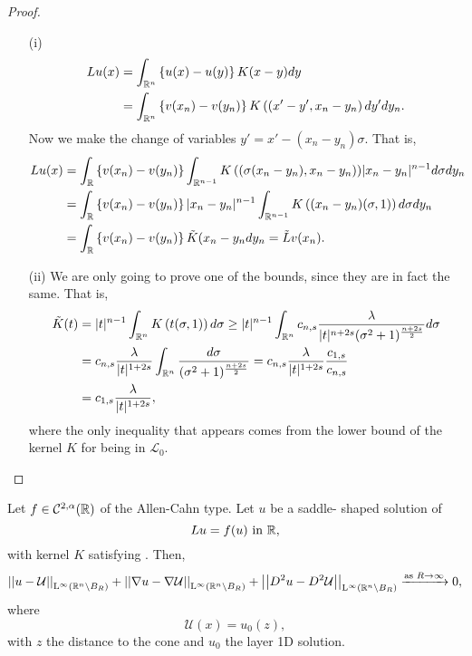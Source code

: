 \begin{proof}
	\begin{enumerate}
		\item[(i)]
		\begin{align*}
		Lu(x) &= \int_{\mathbb{R}^n} \left\{ u(x)-u(y) \right\} K(x-y) dy \\
		&=\int_{\mathbb{R}^n} \left\{ v(x_n)-v(y_n) \right\} K\left((x'-y',x_n-y_n\right) dy'dy_n.
		\end{align*}
		Now we make the change of variables $y' = x'-(x_n-y_n)\sigma$. That is,
		\begin{align*}
		Lu(x) &= \int_{\mathbb{R}} \left\{ v(x_n)-v(y_n) \right\} \int_{\mathbb{R}^{n-1}} K\left((\sigma(x_n-y_n),x_n-y_n\right)) |x_n-y_n|^{n-1} d\sigma dy_n \\
		&= \int_{\mathbb{R}} \left\{ v(x_n)-v(y_n) \right\} |x_n-y_n|^{n-1} \int_{\mathbb{R}^{n-1}} K\left((x_n-y_n)(\sigma,1)\right) d\sigma dy_n \\
		&= \int_{\mathbb{R}} \left\{ v(x_n)-v(y_n) \right\} \tilde{K}(x_n-y_n dy_n = \tilde{L}v(x_n). \\
		\end{align*}
		\item[(ii)] We are only going to prove one of the bounds, since they are in fact the same. That is,
		\begin{align*}
		\tilde{K}(t) &= |t|^{n-1} \int_{\mathbb{R}^n} K\left(t(\sigma,1)\right) d\sigma \geq |t|^{n-1} \int_{\mathbb{R}^n} c_{n,s} \frac{\lambda}{|t|^{n+2s}(\sigma^2+
			1)^{\frac{n+2s}{2}}} d\sigma \\
		&= c_{n,s} \frac{\lambda}{|t|^{1+2s}} \int_{\mathbb{R}^n} \frac{d\sigma}{(\sigma^2+1)^{\frac{n+2s}{2}}} = c_{n,s} \frac{\lambda}{|t|^{1+2s}} \frac{c_{1,s}}{c_{n,s}} \\
		&= c_{1,s} \frac{\lambda}{|t|^{1+2s}},
		\end{align*}
		where the only inequality that appears comes from the lower bound of the kernel $K$ for being in $\mathcal{L}_0$.
	\end{enumerate}
\end{proof}







\begin{theorem}
\label{Thm:AsymptoticBehaviourSaddleSolution}
Let $f\in \mathcal{C}^{2,\alpha}(\mathbb{R})$ of the Allen-Cahn type. Let $u$ be a saddle- shaped solution of
$$
Lu = f(u) \ \textrm{in } \R,
$$
with kernel $K$ satisfying .
Then,
$$
\left | \left |{u-\mathcal{U}} \right | \right |_{\mathrm{L}^{\infty}(\mathbb{R}^n\setminus B_R)}+\left | \left |{\nabla u-\nabla \mathcal{U}} \right | \right |_{\mathrm{L}^{\infty}(\mathbb{R}^n\setminus B_R)}+\left | \left |{D^2u-D^2\mathcal{U}} \right | \right |_{\mathrm{L}^{\infty}(\mathbb{R}^n\setminus B_R)} \xrightarrow{\text{as } R\to \infty}{} 0,
$$
where
$$
\mathcal{U}(x) = u_0(z),
$$
with $z$ the distance to the cone and $u_0$ the layer 1D solution.
\end{theorem}


